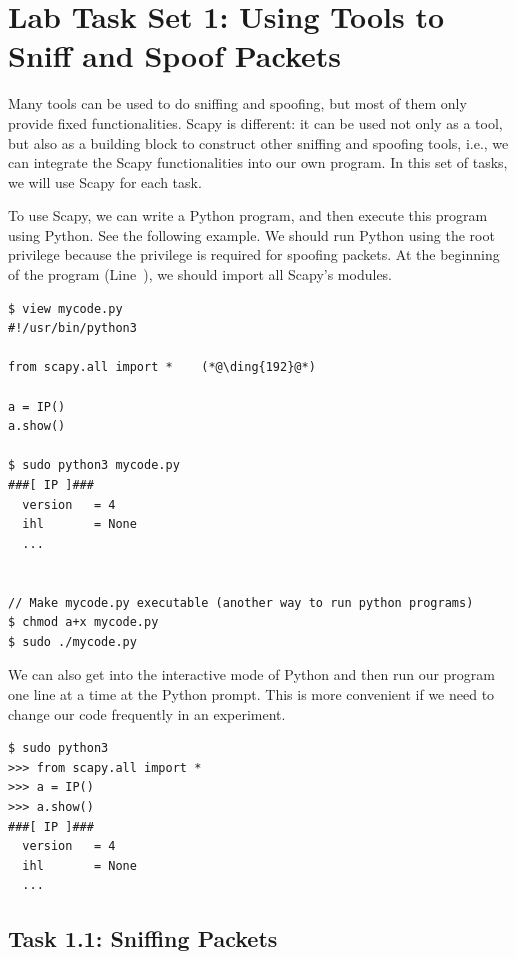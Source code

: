 \section{Lab Task Set 1: Using Tools to Sniff and Spoof Packets}


Many tools can be used to do sniffing and spoofing, but most of them only provide 
fixed functionalities. Scapy is different: it can be used not only as a tool, 
but also as a building block to construct other sniffing and spoofing
tools, i.e., we can integrate the Scapy functionalities into our own
program.  In this set of tasks, we will use Scapy for each task. 


To use Scapy, we can write a Python program, and then execute this program
using Python. See the following example. We should run Python using the 
root privilege because the privilege is required for spoofing packets. 
At the beginning of the program (Line~), 
we should import all Scapy's modules.

\begin{lstlisting}
$ view mycode.py
#!/usr/bin/python3

from scapy.all import *    (*@\ding{192}@*)

a = IP()
a.show()

$ sudo python3 mycode.py
###[ IP ]###
  version   = 4
  ihl       = None
  ...


// Make mycode.py executable (another way to run python programs)
$ chmod a+x mycode.py
$ sudo ./mycode.py 
\end{lstlisting}


We can also get into the interactive mode of Python and
then run our program one line at a time at the Python prompt. 
This is more convenient if we need to change our code 
frequently in an experiment.

\begin{lstlisting}
$ sudo python3
>>> from scapy.all import *
>>> a = IP()
>>> a.show()
###[ IP ]###
  version   = 4
  ihl       = None
  ...
\end{lstlisting}
 

\subsection{Task 1.1: Sniffing Packets}  


